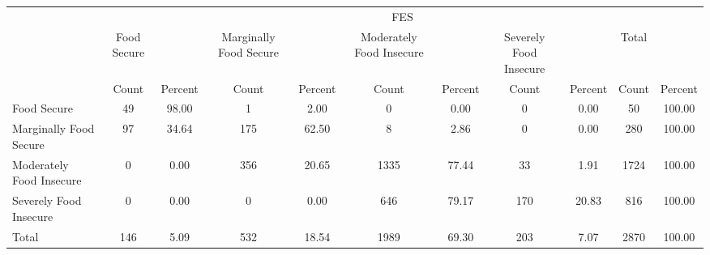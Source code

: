 {
\def\sym#1{\ifmmode^{#1}\else\(^{#1}\)\fi}
\begin{tabular}{l*{5}{cc}}
\hline\hline
            &\multicolumn{10}{c}{FES}                                                                                                         \\
            & Food Secure&            &Marginally Food Secure&            &Moderately Food Insecure&            &Severely Food Insecure&            &       Total&            \\
            &       Count&     Percent&       Count&     Percent&       Count&     Percent&       Count&     Percent&       Count&     Percent\\
\hline
Food Secure &          49&       98.00&           1&        2.00&           0&        0.00&           0&        0.00&          50&      100.00\\
Marginally Food Secure&          97&       34.64&         175&       62.50&           8&        2.86&           0&        0.00&         280&      100.00\\
Moderately Food Insecure&           0&        0.00&         356&       20.65&        1335&       77.44&          33&        1.91&        1724&      100.00\\
Severely Food Insecure&           0&        0.00&           0&        0.00&         646&       79.17&         170&       20.83&         816&      100.00\\
Total       &         146&        5.09&         532&       18.54&        1989&       69.30&         203&        7.07&        2870&      100.00\\
\hline\hline
\end{tabular}
}
